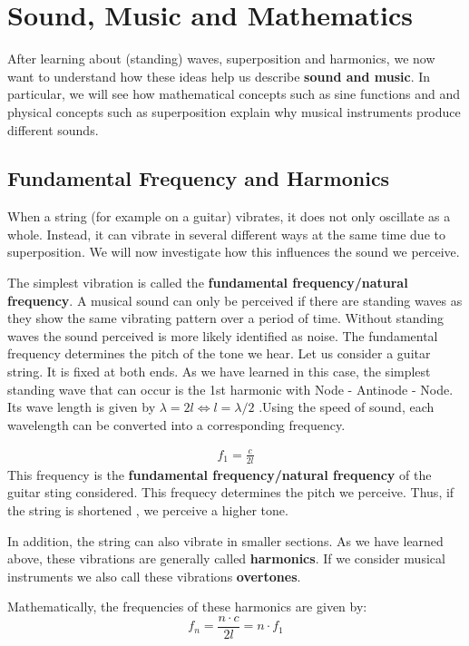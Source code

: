 \section{Sound, Music and Mathematics}

After learning about (standing)  waves, superposition and harmonics, we now want to understand how these ideas help us describe \textbf{sound and music}. In particular, we will see how mathematical concepts such as sine functions and and physical concepts such as superposition explain why musical instruments produce different sounds.

\subsection{Fundamental Frequency and Harmonics}

When a string (for example on a guitar) vibrates, it does not only oscillate as a whole. Instead, it can vibrate in several different ways at the same time due to superposition.  We will now investigate how this influences the sound we perceive. 

The simplest vibration is called the \textbf{fundamental frequency/natural frequency}. A musical sound can only be perceived if there are standing waves as they show the same vibrating pattern over a period of time. Without standing waves the sound perceived is more likely identified as noise.
The fundamental frequency determines the pitch of the tone we hear. Let us consider a guitar string. It is fixed at both ends. As we have learned in this case, the simplest standing wave that can occur is the 1st harmonic with Node - Antinode - Node. Its wave length is given by $ \lambda = 2 l  \Leftrightarrow l = \lambda/2$ .Using the speed of sound, each wavelength can be converted into a corresponding frequency. 

\begin{align}
    f _1=  \frac{c}{2l}
\end{align}
This frequency is the \textbf{fundamental frequency/natural frequency} of the guitar sting considered. This frequecy determines the pitch we perceive. Thus, if the string is shortened , we perceive a higher tone. 

In addition, the string can also vibrate in smaller sections. As we have learned above, these vibrations are generally called \textbf{harmonics}. If we consider musical instruments we also call these vibrations  \textbf{overtones}.

Mathematically, the frequencies of these harmonics are given by:
\begin{equation}
    f_n = \frac{n \cdot c}{2l}=  n \cdot f_1
\end{equation}

